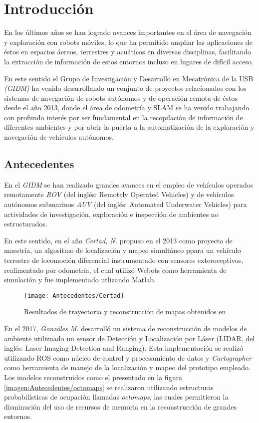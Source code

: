\chapter{Introducción}
\label{capitulo1}

En los últimos años se han logrado avances importantes en el área de navegación y exploración con robots móviles, lo que ha permitido ampliar las aplicaciones de éstos en espacios áereos, terrestres y acuáticos en diversas disciplinas, facilitando la extracción de información de estos entornos incluso en lugares de difícil acceso.

En este sentido el Grupo de Investigación y Desarrollo en Mecatrónica de la USB \textit{(GIDM)} ha venido desarrollando un conjunto de proyectos relacionados con los sistemas de navegación de robots autónomos y de operación remota de éstos desde el año 2013, donde el área de odometría y SLAM se ha venido trabajando con profundo interés por ser fundamental en la recopilación de información de diferentes ambientes y por abrir la puerta a la automatización de la exploración y navegación de vehículos autónomos.

\section{Antecedentes}

En el \textit{GIDM} se han realizado grandes avances en el empleo de vehículos operados remotamente \textit{ROV} (del inglés: Remotely Operated Vehicles) y de vehículos autónomos submarinos \textit{AUV} (del inglés: Automated Underwater Vehicles) para actividades de investigación, exploración e inspección de ambientes no estructurados.

En este sentido, en el año \textit{Certad, N.} \cite{novel} propuso en el 2013 como proyecto de maestría, un algoritmo de localización y mapeo simultáneo ppara un vehículo terrestre de locomoción diferencial instrumentado con sensores exteroceptivos, realimentado por odometría, el cual utilizó Webots como herramienta de simulación y fue implementado utlizando Matlab.


\begin{figure}[H]
	\centering
	\texttt{[image: Antecedentes/Certad]}
	\caption{Resultados de trayectoria y reconstrucción de mapas obtenidos en \cite{novel}}
	\label{imagen:Antecedentes/Certad}
\end{figure}

En el 2017, \textit{Gonzáles M.} \cite{manuel} desarrolló un sistema de reconstrucción de modelos de ambiente utiliznado un sensor de Detección y Localización por Láser (LIDAR, del inglés: Laser Imaging Detection and Ranging). Esta implementación se realizó utilizando ROS como núcleo de control y procesamiento de datos y \textit{Cartographer} como herramienta de manejo de la localización y mapeo del prototipo empleado. Los modelos reconstruidos como el presentado en la figura \ref{imagen:Antecedentes/octomaps} se realizaron utilizando estructuras probabilísticas de ocupación llamadas \textit{octomaps}, las cuales permitieron la disminución del uso de recursos de memoria en la reconstrucción de grandes entornos.


